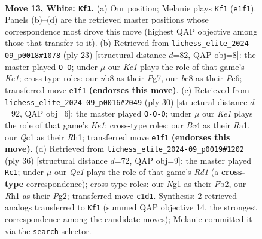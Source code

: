 \documentclass[11pt]{article}
\begin{document}
\clearpage

\begin{figure}[p]\centering
\begin{subfigure}{0.46\textwidth}\centering
\resizebox{\linewidth}{!}{%
\newchessgame
\chessboard[
  setfen={rnb1r1k1/ppq2pbp/6p1/2pPp1B1/2B1P3/2P5/P4PPP/R1Q1K1NR w - - 2 13},
  showmover=false,
  pgfstyle=straightmove, color=movearrow, markmove={e1-f1}
]}
\caption{}
\end{subfigure}\hfill
\begin{subfigure}{0.46\textwidth}\centering
\resizebox{\linewidth}{!}{%
\newchessgame
\chessboard[
  setfen={r2qk2r/2p2ppp/p1p5/2bpP3/8/2P2NQ1/PPb3PP/R1B2R1K b kq - 3 12},
  showmover=false,
  pgfstyle=straightmove, color=movearrow, markmove={e8-g8}
]}
\caption{}
\end{subfigure}
\\[4pt]
\begin{subfigure}{0.46\textwidth}\centering
\resizebox{\linewidth}{!}{%
\newchessgame
\chessboard[
  setfen={r1b2rk1/ppq2p1p/2p2ppb/8/2PP1P2/P1NB2P1/1PQ4P/R3K2R w KQ - 2 16},
  showmover=false,
  pgfstyle=straightmove, color=movearrow, markmove={e1-c1}
]}
\caption{}
\end{subfigure}\hfill
\begin{subfigure}{0.46\textwidth}\centering
\resizebox{\linewidth}{!}{%
\newchessgame
\chessboard[
  setfen={1k2rb1r/pp1q1pp1/2p1p3/3nP1Bp/3PN2P/3Q4/PP3PP1/1K1R3R w - - 0 19},
  showmover=false,
  pgfstyle=straightmove, color=movearrow, markmove={d1-c1}
]}
\caption{}
\end{subfigure}
\caption{\textbf{Move 13, White: \texttt{Kf1}.} (a) Our position; Melanie plays \texttt{Kf1} (\texttt{e1f1}). Panels (b)--(d) are the retrieved master positions whose correspondence most drove this move (highest QAP objective among those that transfer to it). (b) Retrieved from \texttt{lichess\_elite\_2024-09\_p0018\#1078} (ply 23) [structural distance $d$=82, QAP obj=8]: the master played \texttt{O-O}; under $\mu$ our \emph{Ke1} plays the role of that game's \emph{Ke1}; cross-type roles: our \emph{n}b8 as their \emph{P}g7, our \emph{b}c8 as their \emph{P}c6; transferred move \texttt{e1f1} \textbf{(endorses this move)}. (c) Retrieved from \texttt{lichess\_elite\_2024-09\_p0016\#2049} (ply 30) [structural distance $d$=92, QAP obj=6]: the master played \texttt{O-O-O}; under $\mu$ our \emph{Ke1} plays the role of that game's \emph{Ke1}; cross-type roles: our \emph{B}c4 as their \emph{R}a1, our \emph{Q}c1 as their \emph{R}h1; transferred move \texttt{e1f1} \textbf{(endorses this move)}. (d) Retrieved from \texttt{lichess\_elite\_2024-09\_p0019\#1202} (ply 36) [structural distance $d$=72, QAP obj=9]: the master played \texttt{Rc1}; under $\mu$ our \emph{Qc1} plays the role of that game's \emph{Rd1} (a \textbf{cross-type} correspondence); cross-type roles: our \emph{N}g1 as their \emph{P}b2, our \emph{R}h1 as their \emph{P}g2; transferred move \texttt{c1d1}. Synthesis: 2 retrieved analogs transferred to \texttt{Kf1} (summed QAP objective 14, the strongest correspondence among the candidate moves); Melanie committed it via the \texttt{search} selector.}
\label{fig:thought-m24}
\end{figure}
\end{document}
